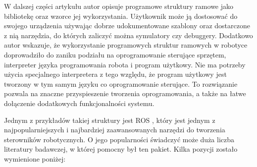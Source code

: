 \documentclass[a4paper, 12pt, twoside]{article}
\begin{document}
W dalszej części artykułu \cite{ramowezielinski} autor opisuje programowe struktury ramowe jako bibliotekę oraz wzorce jej wykorzystania. Użytkownik może ją dostosować do swojego urządzenia używając dobrze udokumentowane szablony oraz dostarczone z nią narzędzia, do których zaliczyć można symulatory czy debuggery. Dodatkowo autor wskazuje, że wykorzystanie programowych struktur ramowych w robotyce doprowadziło do zaniku podziału na oprogramowanie sterujące sprzętem, interpreter języka programowania robota i program użytkowy. Nie ma potrzeby użycia specjalnego interpretera z tego względu, że program użytkowy jest tworzony w tym samym języku co oprogramowanie sterujące. To rozwiązanie pozwala na znaczne przyspieszenie tworzenia oprogramowania, a także na łatwe dołączenie dodatkowych funkcjonalności systemu.

Jednym z przykładów takiej struktury jest ROS \cite{rosdesc}, który jest jednym z najpopularniejszych i najbardziej zaawansowanych narzędzi do tworzenia sterowników robotycznych. O jego popularności świadczyć może duża liczba literatury badawczej, w której pomocny był ten pakiet. Kilka pozycji zostało wymienione poniżej:
\end{document}
